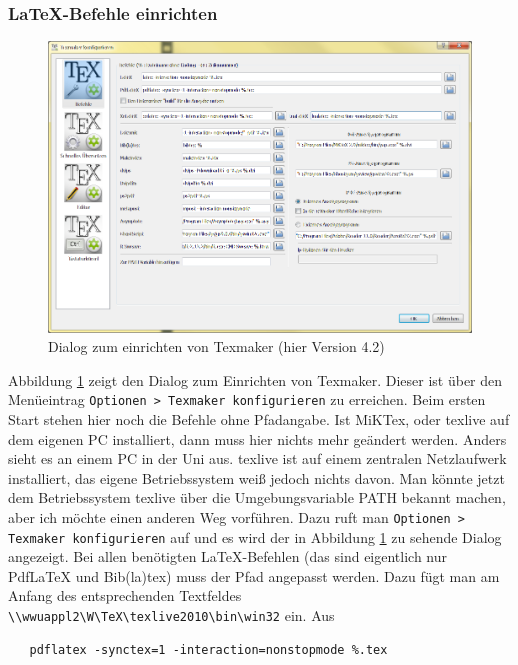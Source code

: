 \subsubsection{\LaTeX-Befehle einrichten}\label{sec:texmaker_conf}

\begin{figure}[bh]
\includegraphics[width=\textwidth]{Bilder/Texmaker_konfigurieren.png} 
\caption{Dialog zum einrichten von Texmaker (hier Version 4.2)}
\label{img:texmaker_conf}
\end{figure}

Abbildung \ref{img:texmaker_conf} zeigt den Dialog zum Einrichten von Texmaker. Dieser ist über den Menüeintrag \verb+Optionen > Texmaker konfigurieren+ zu erreichen. Beim ersten Start stehen hier noch die Befehle ohne Pfadangabe. Ist MiKTex, oder texlive auf dem eigenen PC installiert, dann muss hier nichts mehr geändert werden. Anders sieht es an einem PC in der Uni aus. texlive ist auf einem zentralen Netzlaufwerk installiert, das eigene Betriebssystem weiß jedoch nichts davon. Man könnte jetzt dem Betriebssystem texlive über die Umgebungsvariable PATH bekannt machen, aber ich möchte einen anderen Weg vorführen. Dazu ruft man \verb+Optionen > Texmaker konfigurieren+ auf und es wird der in Abbildung \ref{img:texmaker_conf} zu sehende Dialog angezeigt. Bei allen benötigten \LaTeX-Befehlen (das sind eigentlich nur PdfLaTeX und Bib(la)tex) muss der Pfad angepasst werden. Dazu fügt man am Anfang des entsprechenden Textfeldes \verb+\\wwuappl2\W\TeX\texlive2010\bin\win32+ ein. Aus 

\begin{verbatim}
   pdflatex -synctex=1 -interaction=nonstopmode %.tex
\end{verbatim}

